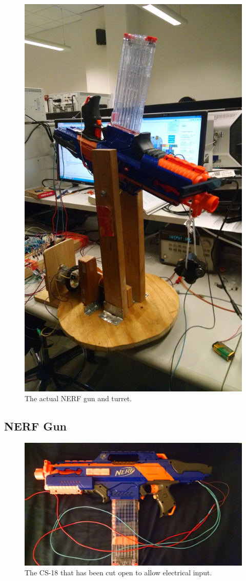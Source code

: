 \documentclass[journal]{IEEEtran}
\begin{document}
\begin{figure}[htbp]
    \centering
    \includegraphics[width=0.60\linewidth]{fullturret.jpg}
    \caption{The actual NERF gun and turret.}
    \label{fig:fullturret}
\end{figure}

\subsection{NERF Gun}

\begin{figure}[htbp]
    \centering
    \includegraphics[width=0.80\linewidth]{gun.jpg}
    \caption{The CS-18 that has been cut open to allow electrical input.}
    \label{fig:gun}
\end{figure}
\end{document}
